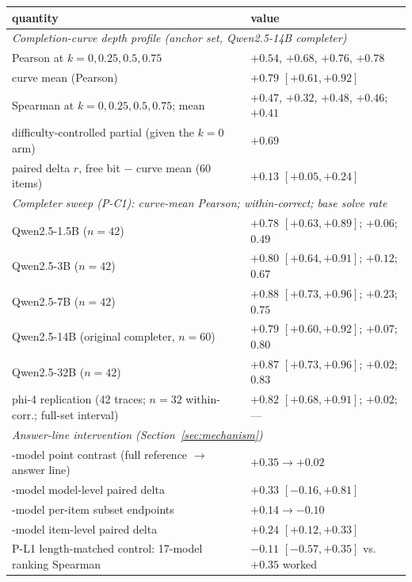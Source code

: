 \begin{table}[t]
\centering
\scriptsize
\setlength{\tabcolsep}{2pt}
\begin{tabular}{ll}
\toprule
quantity & value \\
\midrule
\multicolumn{2}{l}{\emph{Completion-curve depth profile (anchor set, Qwen2.5-14B completer)}} \\
\quad Pearson at $k = 0, 0.25, 0.5, 0.75$ & $+0.54$, $+0.68$, $+0.76$, $+0.78$ \\
\quad curve mean (Pearson) & $+0.79$ $[+0.61, +0.92]$ \\
\quad Spearman at $k = 0, 0.25, 0.5, 0.75$; mean & $+0.47$, $+0.32$, $+0.48$, $+0.46$; $+0.41$ \\
\quad difficulty-controlled partial (given the $k{=}0$ arm) & $+0.69$ \\
\quad paired delta $r$, free bit $-$ curve mean (60 items) & $+0.13$ $[+0.05, +0.24]$ \\
\midrule
\multicolumn{2}{l}{\emph{Completer sweep (P-C1): curve-mean Pearson; within-correct; base solve rate}} \\
\quad Qwen2.5-1.5B ($n{=}42$) & $+0.78$ $[+0.63, +0.89]$; $+0.06$; $0.49$ \\
\quad Qwen2.5-3B ($n{=}42$) & $+0.80$ $[+0.64, +0.91]$; $+0.12$; $0.67$ \\
\quad Qwen2.5-7B ($n{=}42$) & $+0.88$ $[+0.73, +0.96]$; $+0.23$; $0.75$ \\
\quad Qwen2.5-14B (original completer, $n{=}60$) & $+0.79$ $[+0.60, +0.92]$; $+0.07$; $0.80$ \\
\quad Qwen2.5-32B ($n{=}42$) & $+0.87$ $[+0.73, +0.96]$; $+0.02$; $0.83$ \\
\quad phi-4 replication (42 traces; $n{=}32$ within-corr.; full-set interval) & $+0.82$ $[+0.68, +0.91]$; $+0.02$; --- \\
\midrule
\multicolumn{2}{l}{\emph{Answer-line intervention (Section~\ref{sec:mechanism})}} \\
\quad 17-model point contrast (full reference $\to$ answer line) & $+0.35 \to +0.02$ \\
\quad 17-model model-level paired delta & $+0.33$ $[-0.16, +0.81]$ \\
\quad 12-model per-item subset endpoints & $+0.14 \to -0.10$ \\
\quad 12-model item-level paired delta & $+0.24$ $[+0.12, +0.33]$ \\
\quad P-L1 length-matched control: 17-model ranking Spearman & $-0.11$ $[-0.57, +0.35]$ vs.\ $+0.35$ worked \\

\end{tabular}
\end{table}
